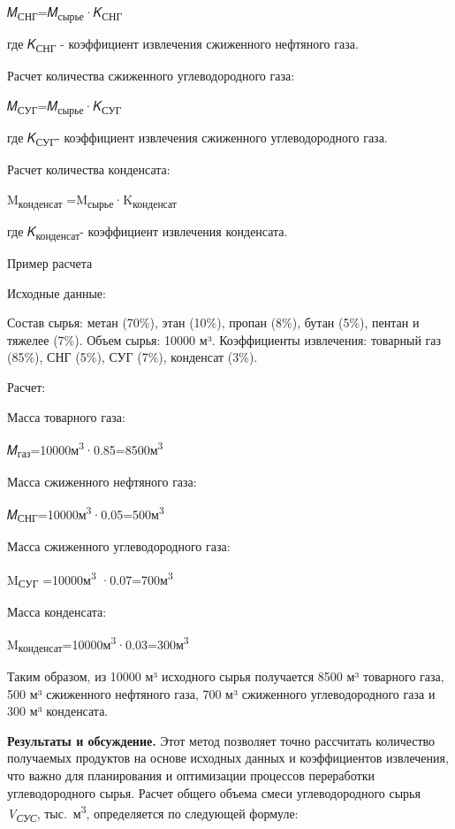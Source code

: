 𝑀\textsubscript{СНГ}=𝑀\textsubscript{сырье}·𝐾\textsubscript{СНГ}

\hspace{0pt}где 𝐾\textsubscript{СНГ} - коэффициент извлечения сжиженного
нефтяного газа.

Расчет количества сжиженного углеводородного газа:

𝑀\textsubscript{СУГ}=𝑀\textsubscript{сырье}·𝐾\textsubscript{СУГ}

\hspace{0pt}где 𝐾\textsubscript{СУГ}- коэффициент извлечения сжиженного
углеводородного газа.

Расчет количества конденсата:

M\textsubscript{конденсат}
=M\textsubscript{сырье}·K\textsubscript{конденсат}

где 𝐾\textsubscript{конденсат}- коэффициент извлечения конденсата.

Пример расчета

Исходные данные:

Состав сырья: метан (70\%), этан (10\%), пропан (8\%), бутан (5\%),
пентан и тяжелее (7\%). Объем сырья: 10000 м³. Коэффициенты извлечения:
товарный газ (85\%), СНГ (5\%), СУГ (7\%), конденсат (3\%).

Расчет:

Масса товарного газа:

𝑀\textsubscript{газ}=10000м\textsuperscript{3}·0.85=8500м\textsuperscript{3}

Масса сжиженного нефтяного газа:

𝑀\textsubscript{СНГ}=10000м\textsuperscript{3}·0.05=500м\textsuperscript{3}

Масса сжиженного углеводородного газа:

M\textsubscript{СУГ} =10000м\textsuperscript{3}
·0.07=700м\textsuperscript{3}

Масса конденсата:

M\textsubscript{конденсат}=10000м\textsuperscript{3}·0.03=300м\textsuperscript{3}

Таким образом, из 10000 м³ исходного сырья получается 8500 м³ товарного
газа, 500 м³ сжиженного нефтяного газа, 700 м³ сжиженного
углеводородного газа и 300 м³ конденсата.

{\bfseries Результаты и обсуждение.} Этот метод позволяет точно рассчитать
количество получаемых продуктов на основе исходных данных и
коэффициентов извлечения, что важно для планирования и оптимизации
процессов переработки углеводородного сырья. Расчет общего объема смеси
углеводородного сырья \emph{V\textsubscript{СУС}},
тыс.~м\textsuperscript{3}, определяется по следующей формуле:


